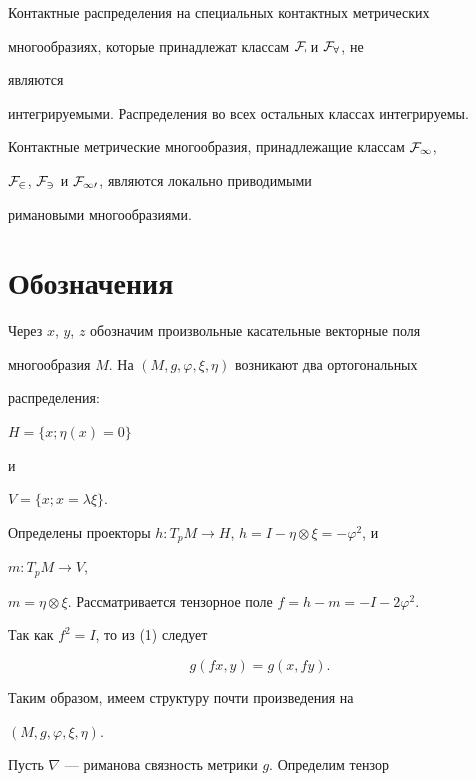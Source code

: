  


Контактные распределения на специальных контактных метрических 


многообразиях, которые принадлежат классам $\cal F_7$ и $\cal F_8$, не 


являются 


интегрируемыми. Распределения во всех остальных классах интегрируемы. 


Контактные метрические многообразия, принадлежащие классам $\cal F_1$, 


$\cal F_2$, $\cal F_3$ и $\cal F_{10}$, являются локально приводимыми 


римановыми многообразиями. 





 


\section{Обозначения} 


 


Через $x$, $y$, $z$ обозначим произвольные касательные векторные поля 


многообразия $M$. На $(M,g,\varphi,\xi,\eta)$ возникают два ортогональных 


распределения: 


$H=\{x;\eta(x)=0\}$ 


и 


$V=\{x;x=\lambda\xi\}$. 


Определены проекторы $h:T_p M\to H$, $h=I-\eta\otimes\xi=-\varphi^2$, и 


$m:T_p M\to V$, 


$m=\eta\otimes\xi$. Рассматривается тензорное поле $f=h-m=-I-2\varphi^2$. 


Так как $f^2=I$, то из (1) следует 


\begin{equation} 


g(f x,y)=g(x,f y). 


\end{equation} 





Таким образом, имеем структуру почти произведения на 


$(M,g,\varphi,\xi,\eta)$. 


 


Пусть $\nabla$ --- риманова связность метрики $g$. Определим тензор 


